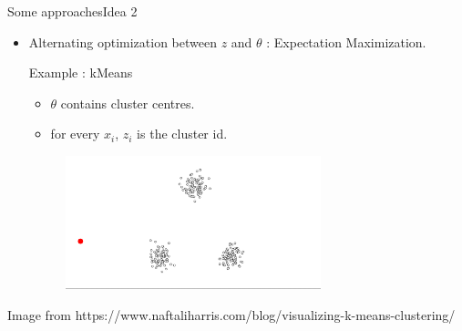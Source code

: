 \documentclass{beamer}
\begin{document}
\begin{frame}{Some approaches}{Idea 2}
    \begin{itemize}
        \item {
            Alternating optimization between $z$ and $\theta$ : Expectation Maximization.

            \vspace{3mm}
            Example : kMeans
            \begin{itemize}
                \item $\theta$ contains cluster centres.
                \item for every $x_i$, $z_i$ is the cluster id.
            \end{itemize}
        }
        \begin{figure}
            \centering
            \includegraphics[width=0.7\textwidth]{kmeans1}
        \end{figure}
    \end{itemize}
    {\small Image from https://www.naftaliharris.com/blog/visualizing-k-means-clustering/}
\end{frame}
\end{document}
